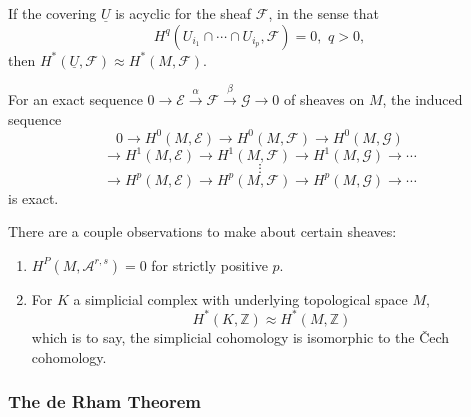 \begin{thm}

	If the covering $ \underline{U}$ is acyclic for the sheaf $ \mathcal{F}$, in the sense that
\[
	H^q( U_{i_1} \cap \cdots \cap U_{i_p}, \mathcal{F}) = 0, \hspace{4pt} q>0, 
\]
then $H^* \left( \underline{U}, \mathcal{F} \right) \approx H^* (M, \mathcal{F})$.\\
\indent

\end{thm}


\begin{prop}

	For an exact sequence $ 0 \to \mathcal{E} \xrightarrow{\alpha} \mathcal{F} \xrightarrow{\beta} \mathcal{G} \to 0$ of sheaves on $M$, the induced sequence
	\[
		0 \to H^0 \left( M, \mathcal{E} \right) \to H^0 \left( M, \mathcal{F} \right) \to H^0 \left( M, \mathcal{G} \right) 
	\]
	\[
		\to H^1 \left( M, \mathcal{E} \right) \to H^1 \left( M, \mathcal{F} \right) \to H^1 \left( M, \mathcal{G} \right) \to \cdots
	\]
	\[
	\vdots
	\]
\[
\to H^p \left( M, \mathcal{E} \right) \to H^p \left( M, \mathcal{F} \right) \to H^p \left( M, \mathcal{G} \right) \to \cdots
\]
is exact.

\end{prop}

There are a couple observations to make about certain sheaves:

\begin{enumerate}
	\item $H^P \left( M, \mathcal{A}^{r,s} \right) =0$ for strictly positive $p$.
	\item For $K$ a simplicial complex with underlying topological space $M$,
		\[
			H^* \left( K, \mathbb{Z} \right) \approx H^* \left( M, \mathbb{Z} \right) 
		\]
		which is to say, the simplicial cohomology is isomorphic to the \v{C}ech cohomology.
\end{enumerate}

\subsubsection{The de Rham Theorem}

